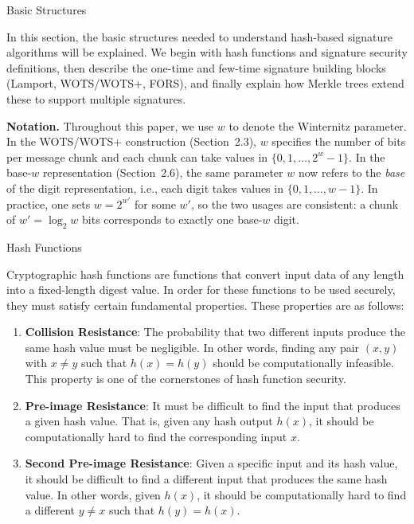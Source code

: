 \documentclass[version=preprint]{iacrcc}
\begin{document}
\begin{section}{Basic Structures}{\label{sec1}}

In this section, the basic structures needed to understand hash-based signature algorithms will be explained. We begin with hash functions and signature security definitions, then describe the one-time and few-time signature building blocks (Lamport, WOTS/WOTS+, FORS), and finally explain how Merkle trees extend these to support multiple signatures.

\textbf{Notation.} Throughout this paper, we use $w$ to denote the Winternitz parameter. In the WOTS/WOTS+ construction (Section~2.3), $w$ specifies the number of bits per message chunk and each chunk can take values in $\{0, 1, \ldots, 2^w - 1\}$. In the base-$w$ representation (Section~2.6), the same parameter $w$ now refers to the \emph{base} of the digit representation, i.e., each digit takes values in $\{0, 1, \ldots, w-1\}$. In practice, one sets $w = 2^{w'}$ for some $w'$, so the two usages are consistent: a chunk of $w' = \log_2 w$ bits corresponds to exactly one base-$w$ digit.


\begin{subsection}{Hash Functions}

    Cryptographic hash functions are functions that convert input data of any length into a fixed-length digest value. In order for these functions to be used securely, they must satisfy certain fundamental properties. These properties are as follows:

    \begin{enumerate}[label=\textbf{\arabic*.}]
    \item \textbf{Collision Resistance}: The probability that two different inputs produce the same hash value must be negligible. In other words, finding any pair $(x, y)$ with $x \neq y$ such that \( h(x) = h(y) \) should be computationally infeasible. This property is one of the cornerstones of hash function security.

    \item \textbf{Pre-image Resistance}: It must be difficult to find the input that produces a given hash value. That is, given any hash output \( h(x) \), it should be computationally hard to find the corresponding input \( x \).

    \item \textbf{Second Pre-image Resistance}: Given a specific input and its hash value, it should be difficult to find a different input that produces the same hash value. In other words, given \( h(x) \), it should be computationally hard to find a different \( y \neq x \) such that \( h(y) = h(x) \).
    

\end{enumerate}
\end{subsection}
\end{section}
\end{document}
